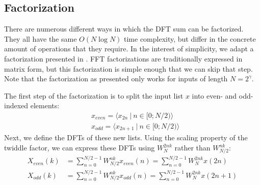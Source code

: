 \subsection{Factorization}

There are numerous different ways in which the DFT sum can be factorized.
They all have the same $O(N \log N)$ time complexity,
but differ in the concrete amount of operations that they require.
In the interest of simplicity,
we adapt a factorization presented in \cite{brunton}.
FFT factorizations are traditionally expressed in matrix form,
but this factorization is simple enough that we can skip that step.
Note that the factorization as presented only works for inputs of length $N = 2^\gamma$.

The first step of the factorization
is to split the input list $x$ into even- and odd-indexed elements:
\begin{align}
    &x_\textit{even} = \langle x_{2n} ~|~ n \in [0; N/2) \rangle\\
    &x_\textit{odd}  = \langle x_{2n + 1} ~|~ n \in [0; N/2) \rangle
\end{align}
%
Next, we define the DFTs of these new lists.
Using the scaling property of the twiddle factor,
we can express these DFTs using $W_N^{2nk}$ rather than $W_{N/2}^{nk}$:
\begin{align}
    X_\textit{even}(k) &= \sum_{n = 0}^{N/2 - 1} W_{N/2}^{nk} x_\textit{even}(n) = \sum_{n = 0}^{N/2 - 1} W_{N}^{2nk} x(2n) \\
    X_\textit{odd}(k) &= \sum_{n = 0}^{N/2 - 1} W_{N/2}^{nk} x_\textit{odd}(n) = \sum_{n = 0}^{N/2 - 1} W_{N}^{2nk} x(2n + 1)
\end{align}

